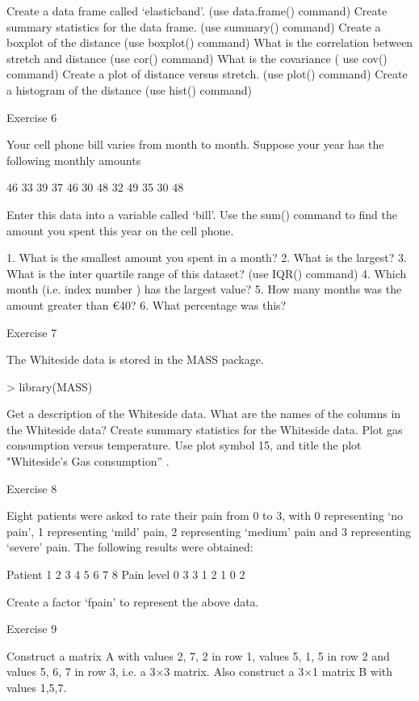 Create a data frame called ‘elasticband’.         (use data.frame() command)
Create summary statistics for the data frame.  (use summary() command)
Create a boxplot of the distance           	          	 (use boxplot() command)
What is the correlation between stretch and distance (use cor() command)
What is the covariance           	          	          	           ( use cov() command)
Create a plot of distance versus stretch.           	             (use plot() command)             
Create a histogram of the distance                             (use hist() command)
 
Exercise 6
 
Your cell phone bill varies from month to month. Suppose your year has the following monthly amounts
 
46 33 39 37 46 30 48 32 49 35 30 48
 
Enter this data into a variable called ‘bill’. Use the sum() command to find the amount you spent this year on the cell phone.
 
1.      What is the smallest amount you spent in a month?
2.      What is the largest?
3.      What is the inter quartile range of this dataset?             	             (use IQR() command)
4.      Which month (i.e. index number ) has the largest value?
5.      How many months was the amount greater than €40?
6.      What percentage was this?
 
Exercise 7
 
The Whiteside data is stored in the MASS package.
 
> library(MASS)
 
Get a description of the Whiteside data.
What are the names of the columns in the Whiteside data?
Create summary statistics for the Whiteside data.
Plot gas consumption versus temperature. Use plot symbol 15, and title the plot "Whiteside’s Gas consumption” .
 
Exercise 8
 
Eight patients were asked to rate their pain from 0 to 3, with 0 representing `no pain', 1 representing `mild' pain, 2 representing `medium' pain and 3 representing `severe'
pain. The following results were obtained:
 
Patient
1
2
3
4
5
6
7
8
Pain level
0
3
3
1
2
1
0
2
 
Create a factor ‘fpain’ to represent the above data.
 
Exercise 9
 
Construct a matrix A with values 2, 7, 2 in row 1, values 5, 1, 5 in row 2 and values 5, 6, 7 in row 3, i.e. a 3×3 matrix. Also construct a  3×1 matrix B with values 1,5,7. 
 
